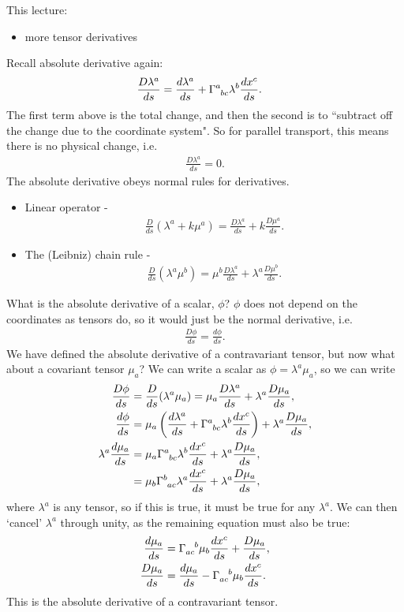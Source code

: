 \documentclass[a4paper, 11pt, normalem]{report}
\begin{document}
This lecture:
\begin{itemize}
    \item more tensor derivatives
\end{itemize}
Recall absolute derivative again:
        \begin{align}
            \frac{D\lambda^a}{ds} &= \frac{d\lambda^a}{ds} + \tensor{\Gamma}{^a_{bc}}\lambda^b\frac{dx^c}{ds}.
        \end{align}
The first term above is the total change, and then the second is to ``subtract off the change due to the coordinate system".
So for parallel transport, this means there is no physical change, i.e.
\begin{align}
    \frac{D\lambda^a}{ds} = 0.
\end{align}
The absolute derivative obeys normal rules for derivatives.
\begin{itemize}
    \item Linear operator -
        \begin{align}
            \frac{D}{ds}\left(\lambda^a+ k\mu^a\right) = \frac{D\lambda^a}{ds} + k\frac{D\mu^a}{ds}.
        \end{align}
    \item The (Leibniz) chain rule -
        \begin{align}
            \frac{D}{ds}\left(\lambda^a\mu^b\right) = \mu^b\frac{D\lambda^a}{ds} + \lambda^a\frac{D\mu^b}{ds}.
        \end{align}
\end{itemize}
What is the absolute derivative of a scalar, $\phi$?
$\phi$ does not depend on the coordinates as tensors do, so it would just be the normal derivative, i.e.
\begin{align}
    \frac{D\phi}{ds} = \frac{d\phi}{ds}.
\end{align}
We have defined the absolute derivative of a contravariant tensor, but now what about a covariant tensor $\mu_a$?
We can write a scalar as $\phi=\lambda^a\mu_a$, so we can write
\begin{align}
    \frac{D\phi}{ds} &= \frac{D}{ds}(\lambda^a\mu_a) = \mu_a\frac{D\lambda^a}{ds}+\lambda^a\frac{D\mu_a}{ds}, \\
    \frac{d\phi}{ds} &= \mu_a\left(\frac{d\lambda^a}{ds} + \tensor{\Gamma}{^a_{bc}}\lambda^b\frac{dx^c}{ds}\right) + \lambda^a\frac{D\mu_a}{ds}, \\
    \lambda^a\frac{d\mu_a}{ds} &= \mu_a\tensor{\Gamma}{^a_{bc}}\lambda^b\frac{dx^c}{ds} + \lambda^a\frac{D\mu_a}{ds}, \\
                               &= \mu_b\tensor{\Gamma}{^b_{ac}}\lambda^a\frac{dx^c}{ds} + \lambda^a\frac{D\mu_a}{ds},
\end{align}
where $\lambda^a$ is any tensor, so if this is true, it must be true for any $\lambda^a$.
We can then `cancel' $\lambda^a$ through unity, as the remaining equation must also be true:
\begin{align}
    \frac{d\mu_a}{ds} &= \tensor{\Gamma}{_{ac}^b}\mu_b\frac{dx^c}{ds} + \frac{D\mu_a}{ds}, \\
    \frac{D\mu_a}{ds} &= \frac{d\mu_a}{ds} - \tensor{\Gamma}{_{ac}^b}\mu_b\frac{dx^c}{ds}.
\end{align}
This is the absolute derivative of a contravariant tensor.
\end{document}
